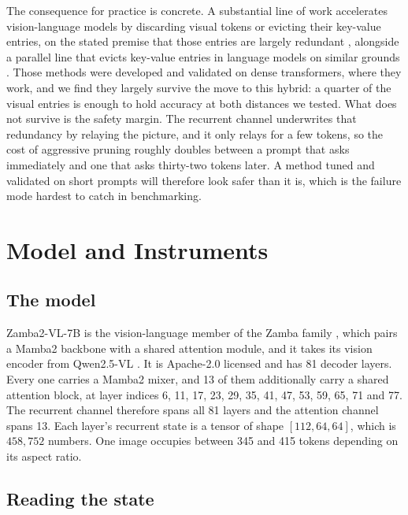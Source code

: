 \documentclass[11pt]{article}
\begin{document}
The consequence for practice is concrete. A substantial line of work accelerates
vision-language models by discarding visual tokens or evicting their key-value
entries, on the stated premise that those entries are largely redundant
\cite{chen2024fastv,yang2024visionzip,shang2025prumerge}, alongside a parallel
line that evicts key-value entries in language models on similar grounds
\cite{zhang2023h2o,li2024snapkv,xiao2024streaming}. Those methods were developed and
validated on dense transformers, where they work, and we find they largely
survive the move to this hybrid: a quarter of the visual entries is enough to
hold accuracy at both distances we tested. What does not survive is the safety
margin. The recurrent channel underwrites that redundancy by relaying the
picture, and it only relays for a few tokens, so the cost of aggressive pruning
roughly doubles between a prompt that asks immediately and one that asks
thirty-two tokens later. A method tuned and validated on short prompts will
therefore look safer than it is, which is the failure mode hardest to catch in
benchmarking.

\section{Model and Instruments}

\subsection{The model}

Zamba2-VL-7B \cite{zamba2vl} is the vision-language member of the Zamba family
\cite{glorioso2024zamba}, which pairs a Mamba2 backbone \cite{dao2024mamba2}
with a shared attention module, and it takes its vision encoder from Qwen2.5-VL
\cite{bai2025qwen25vl}. It is Apache-2.0 licensed and has 81 decoder layers. Every one carries a Mamba2
mixer, and 13 of them additionally carry a shared attention block, at layer
indices 6, 11, 17, 23, 29, 35, 41, 47, 53, 59, 65, 71 and 77. The recurrent
channel therefore spans all 81 layers and the attention channel spans 13. Each
layer's recurrent state is a tensor of shape $[112, 64, 64]$, which is
$458{,}752$ numbers. One image occupies between 345 and 415 tokens depending on
its aspect ratio.

\subsection{Reading the state}
\end{document}
